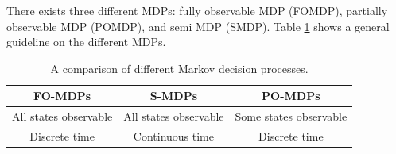 There exists three different MDPs: fully observable MDP (FOMDP), partially observable MDP (POMDP), and semi MDP (SMDP). Table \ref{tab:01mdps} shows a general guideline on the different MDPs.

\begin{table}[H]
\caption{A comparison of different Markov decision processes.}
\centering
\begin{tabular}{c|c|c}
\textbf{FO-MDPs}	& \textbf{S-MDPs}	& \textbf{PO-MDPs}\\
\hline
All states observable		  & All states observable			& Some states observable \\
Discrete time		          & Continuous time	             	& Discrete time \\
\end{tabular}
\label{tab:01mdps}
\end{table}

